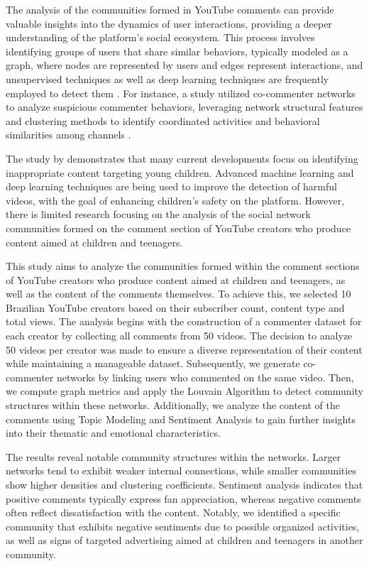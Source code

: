 \documentclass[12pt]{article}
\begin{document}
The analysis of the communities formed in YouTube comments can provide valuable 
insights into the dynamics of user interactions, providing a deeper understanding of 
the platform's social ecosystem. This process involves identifying groups of users that share similar
behaviors, typically modeled as a graph, where nodes are represented by users and edges represent 
interactions, and unsupervised techniques as well as deep learning techniques are frequently employed 
to detect them \cite{nooribakhsh2024community}. For instance, a study utilized co-commenter networks 
to analyze suspicious commenter behaviors, leveraging network structural features and clustering 
methods to identify coordinated activities and behavioral similarities among channels \cite{shajari2023} .

The study by \cite{app13064044} demonstrates that many current developments focus on identifying
inappropriate content targeting young children. Advanced machine learning and deep learning 
techniques are being used to improve the detection of harmful videos, with the goal of enhancing 
children's safety on the platform. However, there is limited research focusing on the analysis of 
the social network communities formed on the comment section of YouTube creators who 
produce content aimed at children and teenagers.

This study aims to analyze the communities formed within the comment sections of YouTube creators who 
produce content aimed at children and teenagers, as well as the content of the comments themselves. 
To achieve this, we selected 10 Brazilian YouTube creators based on their 
subscriber count, content type and total views. The analysis begins with the construction of a commenter dataset for 
each creator by collecting all comments from 50 videos. 
The decision to analyze 50 videos per creator was made to ensure a diverse representation of their 
content while maintaining a manageable dataset.
Subsequently, we generate co-commenter networks 
by linking users who commented on the same video. Then, we compute graph metrics and apply the 
Louvain Algorithm to detect community structures within these networks. Additionally, we analyze the 
content of the comments using Topic Modeling and Sentiment Analysis to gain further 
insights into their thematic and emotional characteristics. 

The results reveal notable community structures within the networks. Larger networks tend to exhibit 
weaker internal connections, while smaller communities show higher densities and clustering coefficients. 
Sentiment analysis indicates that positive comments typically express fan appreciation, whereas negative 
comments often reflect dissatisfaction with the content. 
Notably, we identified a specific community that exhibits negative sentiments due 
to possible organized activities, as well as signs of targeted advertising aimed at children and teenagers 
in another community. 
\end{document}
